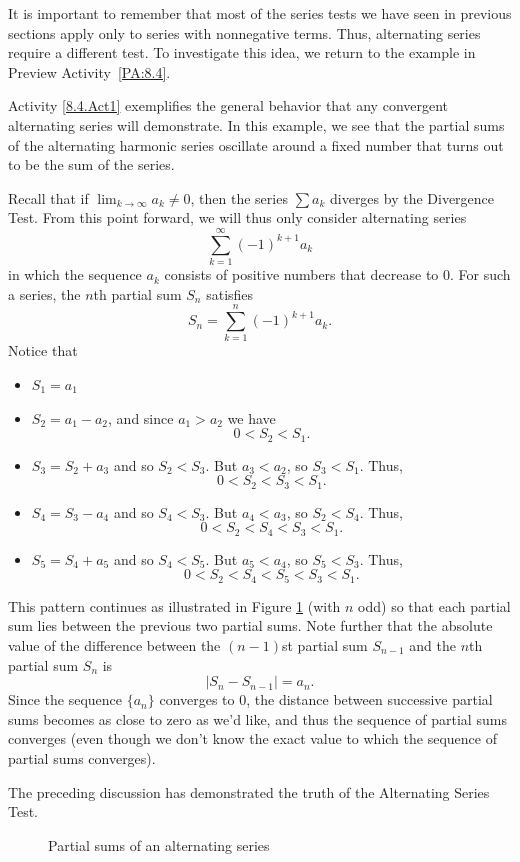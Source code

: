 It is important to remember that most of the series tests we have seen in previous sections apply only to series with nonnegative terms. Thus, alternating series require a different test. To investigate this idea, we return to the example in Preview Activity~\ref{PA:8.4}.



Activity \ref{8.4.Act1} exemplifies the general behavior that any convergent alternating series will demonstrate.  In this example, we see that the partial sums of the alternating harmonic series oscillate around a fixed number that turns out to be the sum of the series.  

Recall that if $ \lim_{k \to \infty} a_k \neq 0$, then the series $\sum a_k$ diverges by the Divergence Test. From this point forward, we will thus only consider alternating series
\[\sum_{k=1}^{\infty} (-1)^{k+1} a_k\]
in which the sequence $a_k$ consists of positive numbers that decrease to 0. For such a series, the $n$th partial sum $S_n$ satisfies
\[S_n = \sum_{k=1}^n (-1)^{k+1} a_k.\]
Notice that
\begin{itemize}
\item $S_1 = a_1$
\item $S_2 = a_1 - a_2$, and since $a_1 > a_2$ we have
\[0 < S_2 < S_1.\]
\item $S_3 = S_2+a_3$ and so $S_2 < S_3$. But $a_3 < a_2$, so $S_3 < S_1$. Thus,
\[0 < S_2 < S_3 < S_1.\]
\item $S_4 = S_3-a_4$ and so $S_4 < S_3$. But $a_4 < a_3$, so $S_2 < S_4$. Thus,
\[0 < S_2 < S_4 < S_3 < S_1.\]
\item $S_5 = S_4+a_5$ and so $S_4 < S_5$. But $a_5 < a_4$, so $S_5 < S_3$. Thus,
\[0 < S_2 < S_4 < S_5 < S_3 < S_1.\]
\end{itemize}
This pattern continues as illustrated in Figure \ref{Fig:8.4_Alternating_Series_Test} (with $n$ odd) so that each partial sum lies between the previous two partial sums. Note further that the absolute value of the difference between the $(n-1)$st partial sum $S_{n-1}$ and the $n$th partial sum $S_n$ is
\[\left| S_n - S_{n-1} \right| = a_n.\]
Since the sequence $\{a_n\}$ converges to 0, the distance between successive partial sums becomes as close to zero as we'd like, and thus the sequence of partial sums converges (even though we don't know the exact value to which the sequence of partial sums converges). 

The preceding discussion has demonstrated the truth of the Alternating Series Test. 
\begin{figure}[h]
\begin{center}
\caption{Partial sums of an alternating series}
\label{Fig:8.4_Alternating_Series_Test}
\end{center}
\end{figure}

